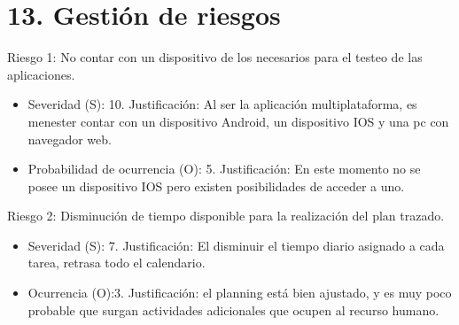 \documentclass[
11pt, %
]{charter}
\begin{document}
\section{13. Gestión de riesgos}
\label{sec:riesgos}


 
Riesgo 1: No contar con un dispositivo de los necesarios para el testeo de las aplicaciones.
\begin{itemize}
	\item Severidad (S): 10.\newline 
	Justificación: Al ser la aplicación multiplataforma, es menester contar con un dispositivo Android, un dispositivo IOS y una pc con navegador web.
	\item Probabilidad de ocurrencia (O): 5.\newline 
	Justificación: En este momento no se posee un dispositivo IOS pero existen posibilidades de acceder a uno.
\end{itemize}   

Riesgo 2: Disminución de tiempo disponible para la realización del plan trazado.
\begin{itemize}
	\item Severidad (S): 7. \newline 
	Justificación: El disminuir el tiempo diario asignado a cada tarea, retrasa todo el calendario.
	\item Ocurrencia (O):3. \newline 
	Justificación: el planning está bien ajustado, y es muy poco probable que surgan actividades adicionales que ocupen al recurso humano.
\end{itemize}
\end{document}
